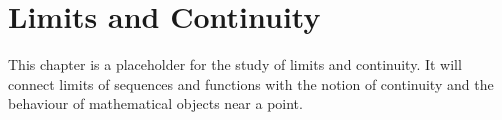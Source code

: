 \chapter{Limits and Continuity}

This chapter is a placeholder for the study of limits and continuity. It will connect limits of sequences and functions with the notion of continuity and the behaviour of mathematical objects near a point.
